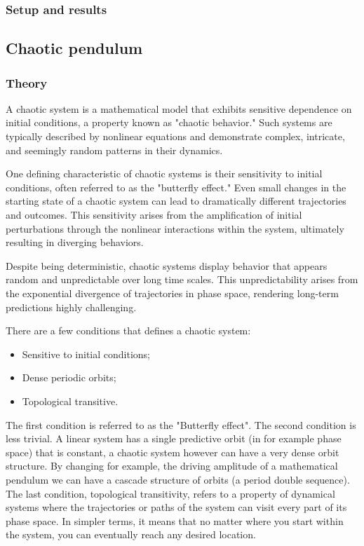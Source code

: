 \documentclass{article}
\begin{document}
\subsubsection{Setup and results}

\newpage

\subsection{Chaotic pendulum}
\subsubsection{Theory}
A chaotic system is a mathematical model that exhibits sensitive dependence on initial conditions, a property known as "chaotic behavior." Such systems are typically described by nonlinear equations and demonstrate complex, intricate, and seemingly random patterns in their dynamics. 

One defining characteristic of chaotic systems is their sensitivity to initial conditions, often referred to as the "butterfly effect." Even small changes in the starting state of a chaotic system can lead to dramatically different trajectories and outcomes. This sensitivity arises from the amplification of initial perturbations through the nonlinear interactions within the system, ultimately resulting in diverging behaviors.

Despite being deterministic, chaotic systems display behavior that appears random and unpredictable over long time scales. This unpredictability arises from the exponential divergence of trajectories in phase space, rendering long-term predictions highly challenging.

There are a few conditions that defines a chaotic system:
\begin{itemize}
    \item Sensitive to initial conditions;
    \item Dense periodic orbits;
    \item Topological transitive.
\end{itemize}
The first condition is referred to as the "Butterfly effect". The second condition is less trivial. A linear system has a single predictive orbit (in for example phase space) that is constant, a chaotic system however can have a very dense orbit structure. By changing for example, the driving amplitude of a mathematical pendulum we can have a cascade structure of orbits (a period double sequence). The last condition, topological transitivity, refers to a property of dynamical systems where the trajectories or paths of the system can visit every part of its phase space. In simpler terms, it means that no matter where you start within the system, you can eventually reach any desired location.
\end{document}
